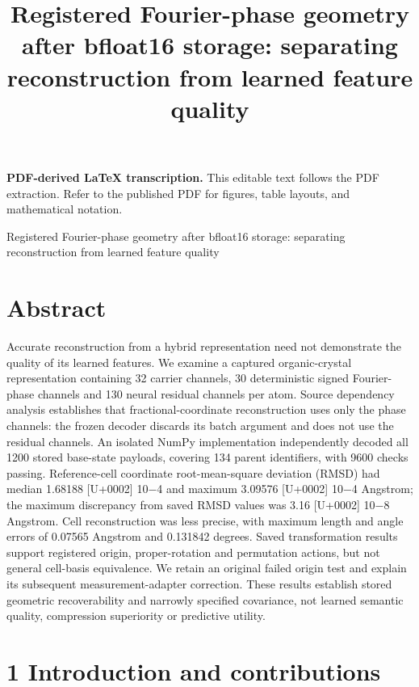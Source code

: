 \documentclass[11pt]{article}
\title{Registered Fourier-phase geometry after bfloat16 storage: separating reconstruction from learned feature quality}
\author{}
\date{}
\begin{document}
\maketitle
\noindent\textbf{PDF-derived LaTeX transcription.} This editable text follows the PDF extraction. Refer to the published PDF for figures, table layouts, and mathematical notation.


Registered Fourier-phase geometry after bfloat16 storage:
separating reconstruction from learned feature quality

\section*{Abstract}

Accurate reconstruction from a hybrid representation need not demonstrate the quality of
its learned features. We examine a captured organic-crystal representation containing 32 carrier
channels, 30 deterministic signed Fourier-phase channels and 130 neural residual channels per
atom. Source dependency analysis establishes that fractional-coordinate reconstruction uses
only the phase channels: the frozen decoder discards its batch argument and does not use the
residual channels. An isolated NumPy implementation independently decoded all 1200 stored
base-state payloads, covering 134 parent identifiers, with 9600 checks passing. Reference-cell
coordinate root-mean-square deviation (RMSD) had median 1.68188 [U+0002] 10\ensuremath{-}4 and maximum
3.09576 [U+0002] 10\ensuremath{-}4 Angstrom; the maximum discrepancy from saved RMSD values was 3.16 [U+0002] 10\ensuremath{-}8
Angstrom. Cell reconstruction was less precise, with maximum length and angle errors of
0.07565 Angstrom and 0.131842 degrees. Saved transformation results support registered origin,
proper-rotation and permutation actions, but not general cell-basis equivalence. We retain an
original failed origin test and explain its subsequent measurement-adapter correction. These
results establish stored geometric recoverability and narrowly specified covariance, not learned
semantic quality, compression superiority or predictive utility.

\section*{1 Introduction and contributions}
\end{document}
